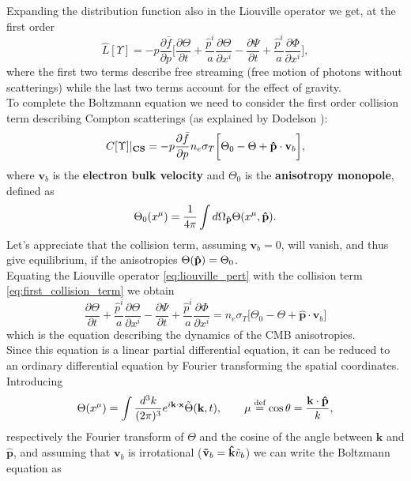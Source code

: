 Expanding the distribution function also in the Liouville operator we get, at the first order
\begin{equation}\label{eq:liouville_pert}
    \hat L[\Upsilon] = -p\frac{\partial\bar f}{\partial p}\bigg[\frac{\partial \Theta}{\partial t}+\frac{\hat p^i}{a}\frac{\partial \Theta}{\partial x^i}-\frac{\partial\Psi}{\partial t}+\frac{\hat p^i}{a}\frac{\partial \Phi}{\partial x^i}\bigg],
\end{equation}
where the first two terms describe free streaming (free motion of photons without scatterings) while the last two terms account for the effect of gravity.\\

To complete the Boltzmann equation we need to consider the first order collision term describing Compton scatterings (as explained by Dodelson \cite{dodelson}):
\begin{equation} \label{eq:first_collision_term}
    C[\Upsilon]|_{\text{\textbf{CS}}} = -p\frac{\partial\bar f}{\partial p} n_{e}\sigma_T\bigg[\Theta_0-\Theta+\mathbf{\hat{p}}\cdot\mathbf{v}_{b}\bigg],
\end{equation}
where $\mathbf{v}_{b}$ is the \textbf{electron bulk velocity} and $\Theta_0$ is the \textbf{anisotropy monopole}, defined as 
$$\Theta_0(x^\mu)=\frac{1}{4\pi}\int d\Omega_{\mathbf{\hat{p}}} \Theta(x^\mu,\mathbf{\hat{p}}).$$
Let's appreciate that the collision term, assuming $\mathbf{v}_b=0$, will vanish, and thus give equilibrium, if the anisotropies $\Theta(\mathbf{\hat{p}})=\Theta_0$.\\
Equating the Liouville operator \eqref{eq:liouville_pert} with the collision term \eqref{eq:first_collision_term} we obtain
\begin{equation}\label{eq:phot_boltzmann_pert}
    \frac{\partial \Theta}{\partial t}+\frac{\hat p^i}{a}\frac{\partial \Theta}{\partial x^i}-\frac{\partial\Psi}{\partial t}+\frac{\hat p^i}{a}\frac{\partial \Phi}{\partial x^i}=n_{e}\sigma_T\bigg[\Theta_0-\Theta+\mathbf{\hat{p}}\cdot\mathbf{v}_{b}\bigg]
\end{equation}
which is the equation describing the dynamics of the CMB anisotropies.\\
Since this equation is a linear partial differential equation, it can be reduced to an ordinary differential equation by Fourier transforming the spatial coordinates.\\
Introducing 
$$\Theta(x^\mu) = \int \frac{d^3k}{(2\pi)^3}e^{i\mathbf{k}\cdot\mathbf{x}}\tilde\Theta(\mathbf{k},t),\qquad \mu\stackrel{\text{def}}{=} \cos\theta=\frac{\mathbf{k}\cdot\mathbf{\hat{p}}}{k},$$respectively the Fourier transform of $\Theta$ and the cosine of the angle between $\mathbf{k}$ and $\mathbf{\hat{p}}$, and assuming that $\mathbf{v}_b$ is irrotational ($\mathbf{\tilde v}_b=\mathbf{\hat{k}}\tilde v_b$) we can write the Boltzmann equation as
